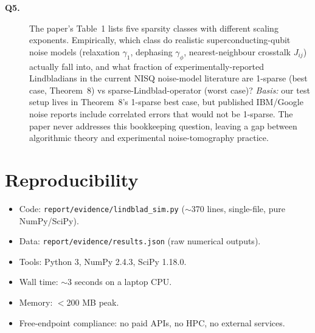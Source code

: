 \documentclass[11pt]{article}
\begin{document}
\begin{description}
\item[\textbf{Q5.}] The paper's Table~1 lists five sparsity classes with different scaling exponents. Empirically, which class do realistic superconducting-qubit noise models (relaxation $\gamma_1$, dephasing $\gamma_\phi$, nearest-neighbour crosstalk $J_{ij}$) actually fall into, and what fraction of experimentally-reported Lindbladians in the current NISQ noise-model literature are 1-sparse (best case, Theorem~8) vs sparse-Lindblad-operator (worst case)? \emph{Basis:} our test setup lives in Theorem~8's 1-sparse best case, but published IBM/Google noise reports include correlated errors that would not be 1-sparse. The paper never addresses this bookkeeping question, leaving a gap between algorithmic theory and experimental noise-tomography practice.
\end{description}

\section{Reproducibility}

\begin{itemize}
  \item Code: \texttt{report/evidence/lindblad_sim.py} ($\sim$370 lines, single-file, pure NumPy/SciPy).
  \item Data: \texttt{report/evidence/results.json} (raw numerical outputs).
  \item Tools: Python 3, NumPy 2.4.3, SciPy 1.18.0.
  \item Wall time: $\sim$3 seconds on a laptop CPU.
  \item Memory: $<$200 MB peak.
  \item Free-endpoint compliance: no paid APIs, no HPC, no external services.
\end{itemize}
\end{document}
